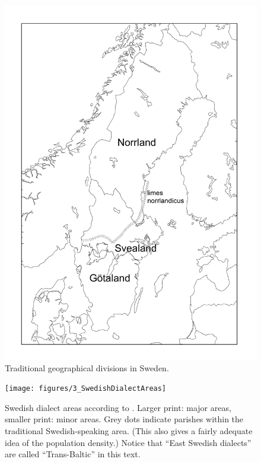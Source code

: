 \begin{figure}[h]

\includegraphics[height=.5\textheight]{figures/2_TraditionalGeographicdivisions}
\caption{Traditional geographical divisions in Sweden.}
\label{map:1}

\end{figure}

\begin{figure}[h]
\texttt{[image: figures/3\_SwedishDialectAreas]}
\caption{Swedish dialect areas according to \citet{Wessén1966}. Larger print: major areas, smaller print: minor areas. Grey dots indicate parishes within the traditional Swedish-speaking area. (This also gives a fairly adequate idea of the population density.) Notice that “East Swedish dialects” are called “Trans-Baltic” in this text.}
\label{map:2}

\end{figure}

